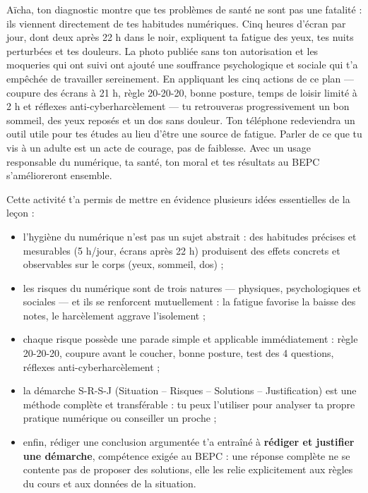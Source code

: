 \documentclass[11pt]{article}
\newcommand{\cle}[1]{{\popxbold\color{popdark}#1}}
\newcounter{popsec}
\newcounter{popsub}
\newcommand{\courssub}[1]{%
  \stepcounter{popsub}%
  \par\vspace{9pt}\noindent{\popxbold\fontsize{11.5}{13}\selectfont\color{popink}{\color{poporange}\thepopsec.\thepopsub}\hspace{6pt}#1}\par\nopagebreak\vspace{4pt}
}
\begin{document}
\begin{exoresolu}
Aïcha, ton diagnostic montre que tes problèmes de santé ne sont pas une fatalité : ils viennent directement de tes habitudes numériques. Cinq heures d'écran par jour, dont deux après 22 h dans le noir, expliquent ta fatigue des yeux, tes nuits perturbées et tes douleurs. La photo publiée sans ton autorisation et les moqueries qui ont suivi ont ajouté une souffrance psychologique et sociale qui t'a empêchée de travailler sereinement. En appliquant les cinq actions de ce plan — coupure des écrans à 21 h, règle 20-20-20, bonne posture, temps de loisir limité à 2 h et réflexes anti-cyberharcèlement — tu retrouveras progressivement un bon sommeil, des yeux reposés et un dos sans douleur. Ton téléphone redeviendra un outil utile pour tes études au lieu d'être une source de fatigue. Parler de ce que tu vis à un adulte est un acte de courage, pas de faiblesse. Avec un usage responsable du numérique, ta santé, ton moral et tes résultats au BEPC s'amélioreront ensemble.
\end{exoresolu}

\courssub{Bilan de l'activité}

Cette activité t'a permis de mettre en évidence plusieurs idées essentielles de la leçon :
\begin{itemize}
\item l'hygiène du numérique n'est pas un sujet abstrait : des habitudes précises et mesurables (5 h/jour, écrans après 22 h) produisent des effets concrets et observables sur le corps (yeux, sommeil, dos) ;
\item les risques du numérique sont de trois natures — physiques, psychologiques et sociales — et ils se renforcent mutuellement : la fatigue favorise la baisse des notes, le harcèlement aggrave l'isolement ;
\item chaque risque possède une parade simple et applicable immédiatement : règle 20-20-20, coupure avant le coucher, bonne posture, test des 4 questions, réflexes anti-cyberharcèlement ;
\item la démarche \cle{S-R-S-J} (Situation -- Risques -- Solutions -- Justification) est une méthode complète et transférable : tu peux l'utiliser pour analyser ta propre pratique numérique ou conseiller un proche ;
\item enfin, rédiger une conclusion argumentée t'a entraîné à \textbf{rédiger et justifier une démarche}, compétence exigée au BEPC : une réponse complète ne se contente pas de proposer des solutions, elle les relie explicitement aux règles du cours et aux données de la situation.
\end{itemize}
\end{document}
